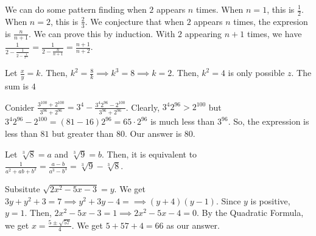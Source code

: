 \documentclass[11pt]{article}
\begin{document}

\begin{sol}
We can do some pattern finding when $2$ appears $n$ times. When $n=1$, this is $\frac{1}{2}$. When $n=2$, this is $\frac{2}{3}$. We conjecture that when $2$ appears $n$ times, the expresion is $\frac{n}{n+1}$. We can prove this by induction. With $2$ appearing $n+1$ times, we have $\frac{1}{2-\frac{1}{2-\frac{1}{2\cdots}}} = \frac{1}{2-\frac{n}{n+1}}=\frac{n+1}{n+2}$.
\end{sol}


\begin{sol} 
Let $\frac{x}{y}=k$. Then, $k^2=\frac{8}{k}\implies k^3 = 8\implies k =2$. Then, $k^2=4$ is only possible $z$. The sum is $\boxed{4}$ 
\end{sol}


\begin{sol}
Conider $\frac{3^{100}+2^{100}}{3^{96}+2^{96}}=3^4-\frac{3^{4}2^{96}-2^{100}}{3^{96}+2^{96}}$. Clearly, $3^{4}2^{96}>2^{100}$ but $3^{4}2^{96}-2^{100}=(81-16)2^{96}=65\cdot 2^{96}$ is much less than $3^{96}$. So, the expression is less than $81$ but greater than $80$. Our answer is $\boxed{80}$.
\end{sol}


\begin{sol}
Let $\sqrt[3]{8}=a$ and $\sqrt[3]{9}=b$. Then, it is equivalent to $\frac{1}{a^2+ab+b^2}=\frac{a-b}{a^3-b^3}=\boxed{\sqrt[3]{9}-\sqrt[3]{8}}$.
\end{sol}


\begin{sol}
Subsitute $\sqrt{2x^2-5x-3}=y$. We get $3y+y^2+3=7\implies y^2+3y-4=\implies (y+4)(y-1)$. Since $y$ is positive, $y=1$. Then, $2x^2-5x-3=1\implies 2x^2-5x-4=0$. By the Quadratic Formula, we get $x=\frac{5 \pm \sqrt{57}}{4}$. We get $5+57+4=\boxed{66}$ as our answer.
\end{sol}
\end{document}
